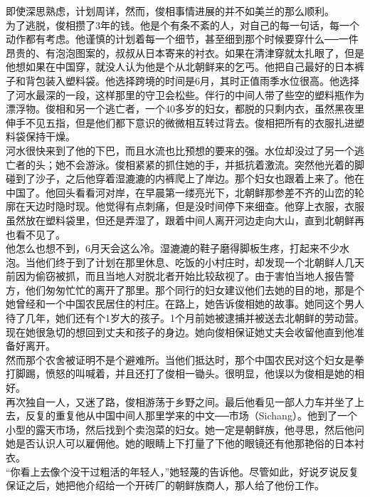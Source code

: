 即使深思熟虑，计划周详，然而，俊相事情进展的并不如美兰的那么顺利。\\

为了逃脱，俊相攒了3年的钱。他是个有条不紊的人，对自己的每一句话，每一个动作都有考虑。他谨慎的计划着每一个细节，甚至细到那个时候要穿什么──一件昂贵的、有泡泡图案的，叔叔从日本寄来的衬衣。如果在清津穿就太扎眼了，但是他想如果在中国穿，就没人认为他是个从北朝鲜来的乞丐。他把自己最好的日本裤子和背包装入塑料袋。他选择跨境的时间是6月，其时正值雨季水位很高。他选择了河水最深的一段，这样那里的守卫会松些。伴行的中间人带了些空的塑料瓶作为漂浮物。俊相和另一个逃亡者，一个40多岁的妇女，都脱的只剩内衣，虽然黑夜里伸手不见五指，但是他们都下意识的微微相互转过背去。俊相把所有的衣服扎进塑料袋保持干燥。\\

河水很快来到了他的下巴，而且水流也比预想的要来的强。水位却没过了另一个逃亡者的头；她不会游泳。俊相紧紧的抓住她的手，并抵抗着激流。突然他光着的脚碰到了沙子，之后他穿着湿漉漉的内裤爬上了岸边。那个妇女也跟着上来了。他在中国了。他回头看看河对岸，在早晨第一缕亮光下，北朝鲜那参差不齐的山峦的轮廓在天边时隐时现。他觉得有点刺痛，但是没时间停下来细查。他穿上衣服，衣服虽然放在塑料袋里，但还是弄湿了，跟着中间人离开河边走向大山，直到北朝鲜再也看不见了。\\

他怎么也想不到，6月天会这么冷。湿漉漉的鞋子磨得脚板生疼，打起来不少水泡。当他们终于到了计划在那里休息、吃饭的小村庄时，却发现一个北朝鲜人几天前因为偷窃被抓，而且当地人对脱北者开始比较敌视了。由于害怕当地人报告警方，他们匆匆忙忙的离开了那里。那个同行的妇女建议他们去她的目的地，那是个她曾经和一个中国农民居住的村庄。在路上，她告诉俊相她的故事。她同这个男人待了几年，她们还有个1岁大的孩子。1个月前她被逮捕并被送去北朝鲜的劳动营。现在她很急切的想回到丈夫和孩子的身边。她向俊相保证她丈夫会收留他直到他准备好离开。\\

然而那个农舍被证明不是个避难所。当他们抵达时，那个中国农民对这个妇女是拳打脚踢，愤怒的叫喊着，并且还打了俊相一锄头。很明显，他误以为俊相是她的相好。\\

再次独自一人，又迷了路，俊相游荡于乡野之间。最后他看见一部人力车并坐了上去，反复的重复他从中国中间人那里学来的中文──市场（Sichang）。他到了一个小型的露天市场，然后找到个卖泡菜的妇女。她一定是朝鲜族，他寻思，然后他问她是否认识人可以雇佣他。她的眼睛上下打量了下他的眼镜还有他那艳俗的日本衬衣。\\

“你看上去像个没干过粗活的年轻人，”她轻蔑的告诉他。尽管如此，好说歹说反复保证之后，她把他介绍给一个开砖厂的朝鲜族商人，那人给了他份工作。\\

